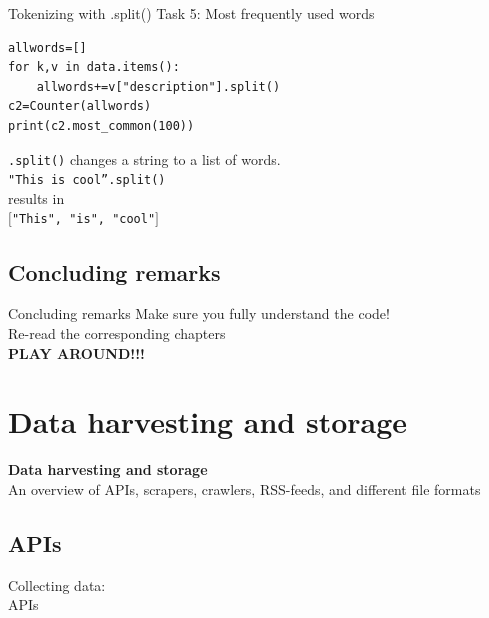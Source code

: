 \documentclass{beamer}
\begin{document}
\begin{frame}[fragile]{Tokenizing with .split()}
Task 5: Most frequently used words
\begin{lstlisting}
allwords=[]
for k,v in data.items():
    allwords+=v["description"].split()
c2=Counter(allwords)
print(c2.most_common(100))
\end{lstlisting}
\scriptsize{
\texttt{.split()} changes a string to a list of words.\\ \texttt{"This is cool''.split()} \\results in\\ \texttt{$[$"This", "is", "cool"$]$}\\
}
\end{frame}


\subsection{Concluding remarks}
\begin{frame}{Concluding remarks}
Make sure you fully understand the code!\\
\vspace{1cm}
Re-read the corresponding chapters\\
\vspace{1cm}
\textbf{PLAY AROUND!!!}\\
\end{frame}



\section{Data harvesting and storage}
\begin{frame}[plain]
\textbf{Data harvesting and storage}\\
\vspace{1cm}
An overview of APIs, scrapers, crawlers, RSS-feeds, and different file formats
\end{frame}



\subsection{APIs}
\begin{frame}
Collecting data:\\
APIs
\end{frame}
\end{document}
